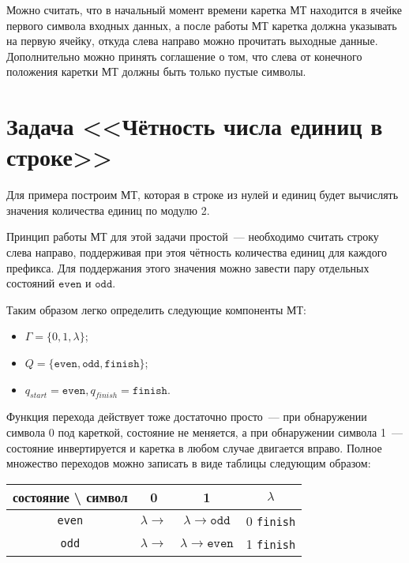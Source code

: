 \documentclass[
    11pt,
    a4paper
]{article}
\theoremstyle{definition}
\begin{document}
Можно считать, что в начальный момент времени каретка МТ находится в ячейке первого символа входных данных, а после работы МТ каретка должна указывать на первую ячейку, откуда слева направо можно прочитать выходные данные. Дополнительно можно принять соглашение о том, что слева от конечного положения каретки МТ должны быть только пустые символы.

\section{Задача <<Чётность числа единиц в строке>>}

Для примера построим МТ, которая в строке из нулей и единиц будет вычислять значения количества единиц по модулю 2. 

Принцип работы МТ для этой задачи простой~--- необходимо считать строку слева направо, поддерживая при этоя чётность количества единиц для каждого префикса. Для поддержания этого значения можно завести пару отдельных состояний $\texttt{even}$ и $\texttt{odd}$.

Таким образом легко определить следующие компоненты МТ: 
\begin{itemize}
\item $\Gamma = \{0, 1, \lambda\}$;
\item $Q = \{\texttt{even}, \texttt{odd}, \texttt{finish}\}$;
\item $q_{start} = \texttt{even}, q_{finish} = \texttt{finish}$.
\end{itemize}

Функция перехода действует тоже достаточно просто~--- при обнаружении символа 0 под кареткой, состояние не меняется, а при обнаружении символа 1~--- состояние инвертируется и каретка в любом случае двигается вправо. Полное множество переходов можно записать в виде таблицы следующим образом:

\begin{center}
\begin{tabular}{ | c | c | c | c |}
\hline
состояние \textbackslash{ }символ & 0 & 1 & $\lambda$ \\ 
 \hline
 \texttt{even} & $\lambda \rightarrow$ & $\lambda \rightarrow \texttt{odd}$ & 0 \texttt{finish}\\  
 \hline
 \texttt{odd} & $\lambda \rightarrow$ & $\lambda \rightarrow \texttt{even}$ & 1 \texttt{finish}\\
 \hline
\end{tabular}
\end{center}
\end{document}
